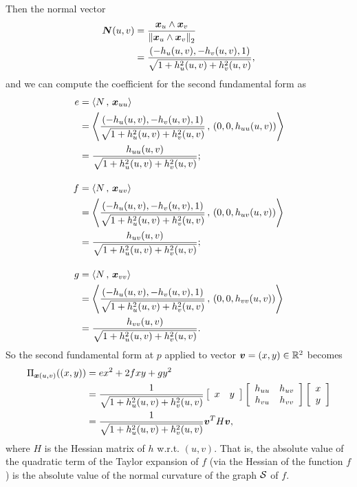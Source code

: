 \documentclass[11pt]{article}
\begin{document}
\begin{enumerate}
\begin{solution}
Then the normal vector 
\begin{align*}
\boldsymbol{N}(u,v) &= \frac{\boldsymbol{x}_{u}\wedge \boldsymbol{x}_{v}}{\left\|\boldsymbol{x}_{u}\wedge \boldsymbol{x}_{v}\right\|_{2}}\\
&= \frac{(- h_{u}(u,v), -h_{v}(u,v), 1)}{\sqrt{1+ h^{2}_{u}(u,v) + h^{2}_{v}(u,v)}},
\end{align*}
and we can compute the coefficient for the second fundamental form as
\begin{align*}
e&= \left\langle N\,,\, \boldsymbol{x}_{uu} \right\rangle \\
&= \left\langle  \frac{(- h_{u}(u,v), -h_{v}(u,v), 1)}{\sqrt{1+ h^{2}_{u}(u,v) + h^{2}_{v}(u,v)}}\,,\,  (0,0, h_{uu}(u,v))  \right\rangle\\
&= \frac{h_{uu}(u,v)}{\sqrt{1+ h^{2}_{u}(u,v) + h^{2}_{v}(u,v)}};\\[10pt]
f&= \left\langle N\,,\, \boldsymbol{x}_{uv} \right\rangle \\
&= \left\langle  \frac{(- h_{u}(u,v), -h_{v}(u,v), 1)}{\sqrt{1+ h^{2}_{u}(u,v) + h^{2}_{v}(u,v)}}\,,\,  (0,0, h_{uv}(u,v))  \right\rangle\\
&= \frac{h_{uv}(u,v)}{\sqrt{1+ h^{2}_{u}(u,v) + h^{2}_{v}(u,v)}};\\[10pt]
g&= \left\langle N\,,\, \boldsymbol{x}_{vv} \right\rangle \\
&= \left\langle  \frac{(- h_{u}(u,v), -h_{v}(u,v), 1)}{\sqrt{1+ h^{2}_{u}(u,v) + h^{2}_{v}(u,v)}}\,,\,  (0,0, h_{vv}(u,v))  \right\rangle\\
&= \frac{h_{vv}(u,v)}{\sqrt{1+ h^{2}_{u}(u,v) + h^{2}_{v}(u,v)}}.
\end{align*}
So the second fundamental form at $p$ applied to vector $\boldsymbol{v}=(x,y)\in {\mathbb R}^{2}$ becomes
\begin{align*}
\Pi_{\boldsymbol{x}(u,v)}((x,y))&= ex^{2} + 2f xy+ gy^{2}\\ 
&= \frac{1}{\sqrt{1+ h^{2}_{u}(u,v) + h^{2}_{v}(u,v)}} \left[\begin{array}{cc}
x & y \end{array} \right]  \left[\begin{array}{cc}
h_{uu} & h_{uv}\\ 
h_{vu} & h_{vv}
\end{array} \right]\left[\begin{array}{c}
x \\ 
y
\end{array} \right]\\
&=\frac{1}{\sqrt{1+ h^{2}_{u}(u,v) + h^{2}_{v}(u,v)}}  \boldsymbol{v}^{T}H\boldsymbol{v},
\end{align*}
where $H$ is the Hessian matrix of $h$ w.r.t. $(u,v)$. That is, the absolute value of the quadratic term of the Taylor expansion of $f$ (via the Hessian of the function $f$) is the absolute value of the normal curvature of the graph ${\mathcal S}$ of $f$.  


\end{solution}
\end{enumerate}
\end{document}
